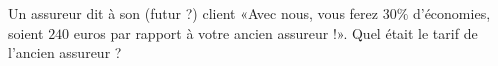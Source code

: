 
\begin{exercice}\label{exoPremiere-0023}

    Un assureur dit à son (futur ?) client «Avec nous, vous ferez \( 30\%\) d'économies, soient \( 240\) euros par rapport à votre ancien assureur !». Quel était le tarif de l'ancien assureur ?

\end{exercice}
